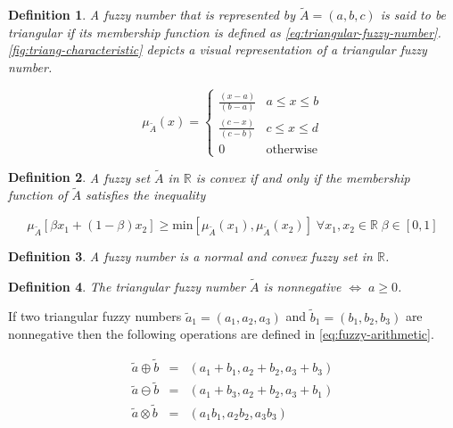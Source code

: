 \documentclass[ee,thesis]{usuthesis}
\newtheorem{definition}{Definition}[section]
\begin{document}
\begin{definition}
\label{def:triangular-fuzzy-number} A fuzzy number that is represented by \(\tilde{A} = (a,b,c)\) is said to be triangular
if its membership function is defined as \ref{eq:triangular-fuzzy-number}. \ref{fig:triang-characteristic} depicts a visual
representation of a triangular fuzzy number.

\begin{equation}
\label{eq:triangular-fuzzy-number}
  \mu_{\tilde{A}}(x) =
  \begin{cases}
    \frac{(x-a)}{(b-a)} & a \le x \le b \\
    \frac{(c-x)}{(c-b)} & c \le x \le d \\
    0                   & \text{otherwise}
  \end{cases}
\end{equation}
\end{definition}

\begin{definition}
A fuzzy set \(\tilde{A}\) in \(\mathbb{R}\) is convex if and only if the membership function of \(\tilde{A}\) satisfies the inequality

\begin{equation*}
\mu_{\tilde{A}}[\beta x_1 + (1-\beta)x_2] \ge \text{min}[\mu_{\tilde{A}}(x_1), \mu_{\tilde{A}}(x_2)]\; \forall x_1, x_2 \in \mathbb{R}\; \beta \in [0,1]
\end{equation*}
\end{definition}

\begin{definition}
A fuzzy number is a normal and convex fuzzy set in \(\mathbb{R}\).
\end{definition}

\begin{definition}
\label{def:triangular-nonnegative}
The triangular fuzzy number \(\tilde{A}\) is nonnegative \(\iff\; a \ge 0\).
\end{definition}

\label{sec:fuzzy-arithmetic}

If two triangular fuzzy numbers \(\tilde{a}_1 = (a_1, a_2, a_3)\) and \(\tilde{b}_1 = (b_1, b_2, b_3)\) are nonnegative
then the following operations are defined in \ref{eq:fuzzy-arithmetic}.

\begin{equation}
\label{eq:fuzzy-arithmetic}
\begin{array}{lcl}
\tilde{a} \oplus \tilde{b} & = & (a_1 + b_1, a_2 + b_2, a_3 + b_3) \\
\tilde{a} \ominus \tilde{b} & = & (a_1 + b_3, a_2 + b_2, a_3 + b_1) \\
\tilde{a} \otimes \tilde{b} & = & (a_1 b_1, a_2 b_2, a_3 b_3)       \\
\end{array}
\end{equation}
\end{document}
